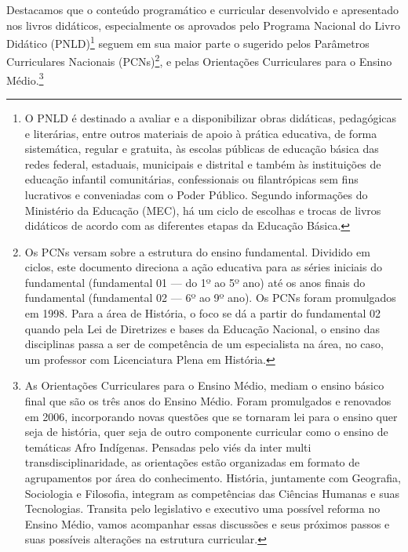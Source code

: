 \begin{refsection}
    Destacamos que o conteúdo programático e curricular desenvolvido e apresentado nos livros didáticos, especialmente os aprovados pelo Programa Nacional do Livro Didático (PNLD)\footnote{O PNLD é destinado a avaliar e a disponibilizar obras didáticas, pedagógicas e literárias, entre outros materiais de apoio à prática educativa, de forma sistemática, regular e gratuita, às escolas públicas de educação básica das redes federal, estaduais, municipais e distrital e também às instituições de educação infantil comunitárias, confessionais ou filantrópicas sem fins lucrativos e conveniadas com o Poder Público. Segundo informações do Ministério da Educação (MEC), há um ciclo de escolhas e trocas de livros didáticos de acordo com as diferentes etapas da Educação Básica.} seguem em sua maior parte o sugerido pelos Parâmetros Curriculares Nacionais (PCNs)\footnote{Os PCNs versam sobre a estrutura do ensino fundamental. Dividido em ciclos, este documento direciona a ação educativa para as séries iniciais do fundamental (fundamental 01 --- do 1º ao 5º ano) até os anos finais do fundamental (fundamental 02 --- 6º ao 9º ano). Os PCNs foram promulgados em 1998. Para a área de História, o foco se dá a partir do fundamental 02 quando pela Lei de Diretrizes e bases da Educação Nacional, o ensino das disciplinas passa a ser de competência de um especialista na área, no caso, um professor com Licenciatura Plena em História.}, e pelas Orientações Curriculares para o Ensino Médio.\footnote{As Orientações Curriculares para o Ensino Médio, mediam o ensino básico final que são os três anos do Ensino Médio. Foram promulgados e renovados em 2006, incorporando novas questões que se tornaram lei para o ensino quer seja de história, quer seja de outro componente curricular como o ensino de temáticas Afro Indígenas. Pensadas pelo viés da inter multi transdisciplinaridade, as orientações estão organizadas em formato de agrupamentos por área do conhecimento. História, juntamente com Geografia, Sociologia e Filosofia, integram as competências das Ciências Humanas e suas Tecnologias. Transita pelo legislativo e executivo uma possível reforma no Ensino Médio, vamos acompanhar essas discussões e seus próximos passos e suas possíveis alterações na estrutura curricular.}


\end{refsection}
